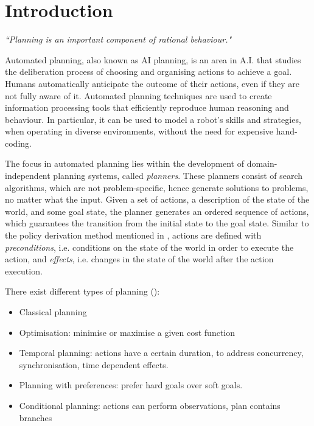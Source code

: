 \section{Introduction}
\begin{center}
\textit{``Planning is an important component of rational behaviour." }\\ \cite{ghallab2004automated}
\end{center}


Automated planning, also known as AI planning, is an area in A.I. that studies the deliberation process of choosing and organising actions to achieve a goal. 
Humans automatically anticipate the outcome of their actions, even if they are not fully aware of it. 
Automated planning techniques are used to create information processing tools that efficiently reproduce human reasoning and behaviour. 
In particular, it can be used to model a robot's skills and strategies, when operating in diverse environments, without the need for expensive hand-coding.

The focus in automated planning lies within the development of {domain-independent} planning systems, called \textit{planners}.
These planners consist of search algorithms, which are not problem-specific, hence generate solutions to problems, no matter what the input. 
Given a set of actions, a description of the state of the world, and some goal state, the planner generates an ordered sequence of actions, which guarantees the transition from the initial state to the goal state. 
Similar to the policy derivation method mentioned in , actions are defined with \textit{preconditions}, i.e. conditions on the state of the world in order to execute the action, and \textit{effects}, i.e. changes in the state of the world after the action execution. 

There exist different types of planning (\cite{ROSplanAAAI17tutorial}):
\begin{itemize}
    \item Classical planning
    \item Optimisation: minimise or maximise a given cost function
    \item Temporal planning: actions have a certain duration, to address concurrency, synchronisation, time dependent effects.
    \item Planning with preferences: prefer hard goals over soft goals.
    \item Conditional planning: actions can perform observations, plan contains branches
\end{itemize}

